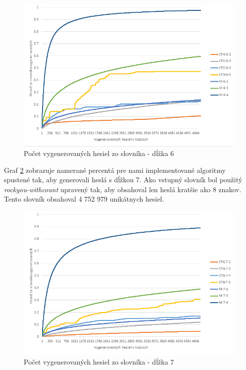 \begin{figure}[ht]
    \centering
    \includegraphics[width=1\textwidth]{sameDictAcc6}
    \caption{Počet vygenerovaných hesiel zo slovníka - dĺžka 6}
    \label{fig:Acc6}
\end{figure}

\pargraph{}
Graf \ref{fig:Acc7} zobrazuje namerané percentá pre nami implementované algoritmy spustené tak, aby generovali heslá s dĺžkou 7. Ako vstupný slovník bol použitý \emph{rockyou-withcount} upravený tak, aby obsahoval len heslá kratšie ako 8 znakov. Tento slovník obsahoval 4 752 979 unikátnych hesiel.

\begin{figure}[ht]
    \centering
    \includegraphics[width=1\textwidth]{sameDictAcc7}
    \caption{Počet vygenerovaných hesiel zo slovníka - dĺžka 7}
    \label{fig:Acc7}
\end{figure}

